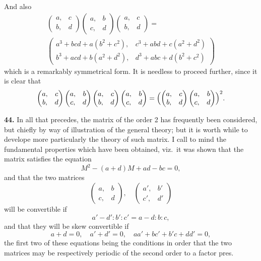 \documentclass[11pt,a4paper]{book}
\begin{document}
\begin{center}
And also
\begin{multline*}
\begin{pmatrix} a, & c \\ b, & d \end{pmatrix}
\begin{pmatrix} a, & b \\ c, & d \end{pmatrix}
\begin{pmatrix} a, & c \\ b, & d \end{pmatrix} = \\
\begin{pmatrix}
a^3+bcd+a(b^2+c^2), & c^3+abd+c(a^2+d^2) \\
b^3+acd+b(a^2+d^2), & d^3+abc+d(b^2+c^2)
\end{pmatrix}
\end{multline*}
which is a remarkably symmetrical form. It is needless to proceed further, since it is clear that
\[
\begin{pmatrix} a, & c \\ b, & d \end{pmatrix}
\begin{pmatrix} a, & b \\ c, & d \end{pmatrix}
\begin{pmatrix} a, & c \\ b, & d \end{pmatrix}
\begin{pmatrix} a, & b \\ c, & d \end{pmatrix}
=\Bigl(
\begin{pmatrix} a, & c \\ b, & d \end{pmatrix}
\begin{pmatrix} a, & b \\ c, & d \end{pmatrix}
\Bigr)^2.
\]

\newpage

\medskip
\noindent\textbf{44.} In all that precedes, the matrix of the order 2 has frequently been considered, but chiefly by way of illustration of the general theory; but it is worth while to develope more particularly the theory of such matrix. I call to mind the fundamental properties which have been obtained, viz.\ it was shown that the matrix satisfies the equation
\[
M^2 - (a+d)M + ad - bc = 0,
\]
and that the two matrices
\[
\begin{pmatrix} a, & b \\ c, & d \end{pmatrix},\quad
\begin{pmatrix} a', & b' \\ c', & d' \end{pmatrix}
\]
will be convertible if
\[a'-d' : b' : c' = a-d : b : c,\]
and that they will be skew convertible if
\[
a+d=0,\quad a'+d'=0,\quad aa'+bc'+b'c+dd'=0,
\]
the first two of these equations being the conditions in order that the two matrices may be respectively periodic of the second order to a factor pres.


\end{center}
\end{document}
